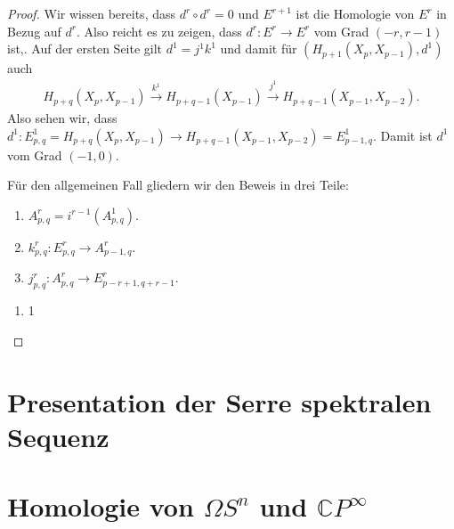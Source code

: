 \documentclass[12pt, hidelinks]{article}
\numberwithin{conj}{section}
\begin{document}
\begin{proof}
Wir wissen bereits, dass $d^r \circ d^r = 0$ und $E^{r+1}$ ist die Homologie von $E^r$ in Bezug auf $d^r$. Also reicht es zu zeigen, dass $d^r: E^r \to E^r$ vom Grad $(-r,r-1)$ ist,. Auf der ersten Seite gilt $d^1=j^1k^1$ und damit für $(H_{p+1}(X_p,X_{p-1}), d^1)$ auch
\begin{align}
    H_{p+q}(X_p,X_{p-1}) \xrightarrow{k^1} H_{p+q-1}(X_{p-1}) \xrightarrow{j^1} H_{p+q-1}(X_{p-1},X_{p-2}).
\end{align}
Also sehen wir, dass $d^1: E^1_{p,q} = H_{p+q}(X_p,X_{p-1}) \to H_{p+q-1}(X_{p-1},X_{p-2}) = E^1_{p-1,q}$. Damit ist $d^1$ vom Grad $(-1,0)$.

Für den allgemeinen Fall gliedern wir den Beweis in drei Teile:
\begin{enumerate}[nolistsep]
    \item $A^r_{p,q} = i^{r-1}(A^1_{p,q})$.
    \item $k_{p,q}^r: E^r_{p,q} \to A^r_{p-1,q}$.
    \item $j_{p,q}^r: A^r_{p,q} \to E^r_{p-r+1,q+r-1}$.
\end{enumerate}
\begin{enumerate}
    \item 1
\end{enumerate}
\end{proof}

\section{Presentation der Serre spektralen Sequenz}

\section{Homologie von $\Omega S^n$ und $\mathbb{C}P^\infty$}
\end{document}
